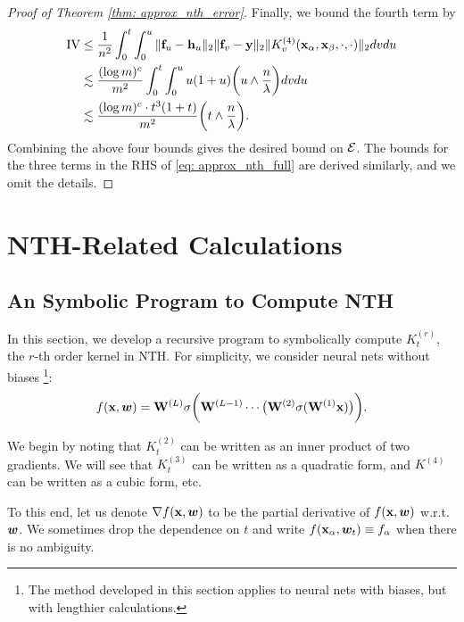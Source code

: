 \begin{proof}[Proof of Theorem \ref{thm: approx_nth_error}]
	Finally, we bound the fourth term by
	\begin{align*}
		\RN{4} & \leq \frac{1}{n^2} \int_0^t\int_0^u \| \rvf_u-\rvh_u\|_2 \|\rvf_v-\rvy \|_2 \| \KKKK_v(\rvx_\alpha,\rvx_\beta,\cdot,\cdot)\|_2 dvdu\\
		& \lesssim \frac{(\log m)^c}{m^2}  \int_0^t\int_0^u u(1+u) \bigg(u\land \frac{n}{\lambda}\bigg) dvdu\\
		& \lesssim \frac{(\log m)^c \cdot t^3(1+t)}{m^2} \bigg(t \land \frac{n}{\lambda}\bigg).
	\end{align*}
	Combining the above four bounds gives the desired bound on ${\mathcal{E}}$. The bounds for the three terms in the RHS of \eqref{eq: approx_nth_full} are derived similarly, and we omit the details.
\end{proof}



\section{NTH-Related Calculations}\label{append:nth_calculations}

\subsection{An Symbolic Program to Compute NTH}
In this section, we develop a recursive program to symbolically compute $K^{(r)}_t$, the $r$-th order kernel in NTH. For simplicity, we consider neural nets without biases \footnote{The method developed in this section applies to neural nets with biases, but with lengthier calculations.}:
\[
f({\mathbf{x}}, {\boldsymbol{w}}) = {\mathbf{W}}^{{}(L)} \sigma\bigg({\mathbf{W}}^{{}(L-1)} \cdots \bigl({\mathbf{W}}^{{}(2)} \sigma({\mathbf{W}}^{{}(1)} {\mathbf{x}} ) \bigr) \bigg).
\]

We begin by noting that $K^{(2)}_t$ can be written as an inner product of two gradients. We will see that $K^{(3)}_t$ can be written as a quadratic form, and $K^{(4)}$ can be written as a cubic form, etc. 

To this end, let us denote $\nabla f({\mathbf{x}}, {\boldsymbol{w}})$ to be the partial derivative of $f({\mathbf{x}}, {\boldsymbol{w}})$ w.r.t. ${\boldsymbol{w}}$. We sometimes drop the dependence on $t$ and write $f({\mathbf{x}}_\alpha, {\boldsymbol{w}}_t) \equiv f_\alpha$ when there is no ambiguity. 

